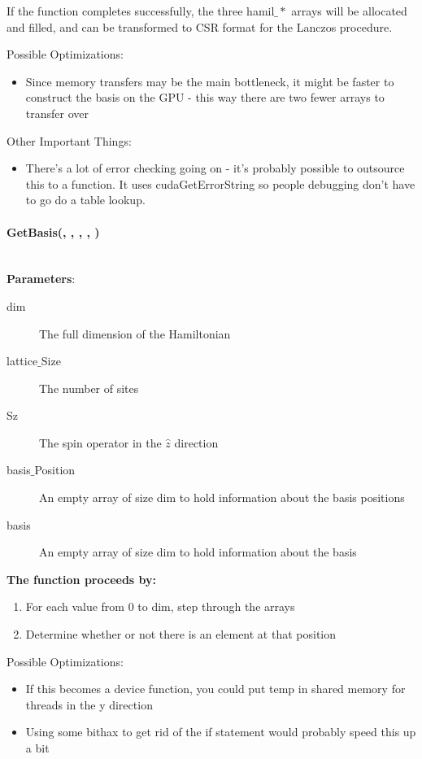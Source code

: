 \documentclass{article}
\begin{document}
If the function completes successfully, the three hamil$\_*$ arrays will be allocated and filled, and can be transformed to CSR format for the Lanczos procedure.
 
Possible Optimizations:
\begin{itemize}
\item{Since memory transfers may be the main bottleneck, it might be faster to construct the basis on the GPU - this way there are two fewer arrays to transfer over}
\end{itemize}

Other Important Things:
\begin{itemize}
\item{ There's a lot of error checking going on - it's probably possible to outsource this to a function. It uses cudaGetErrorString so people debugging don't have to go do a table lookup.}
\end{itemize} 

\paragraph{\host \void GetBasis(\int , \int , \int , \long [], \long []) \\ \\}
\noindent\textbf{Parameters}:
\begin{description}
\item[\long dim] The full dimension of the Hamiltonian
\item[\int lattice$\_$Size] The number of sites
\item[\int Sz] The spin operator in the $\hat{z}$ direction
\item[\long basis$\_$Position] An empty array of size dim to hold information about the basis positions
\item[\long basis] An empty array of size dim to hold information about the basis
\end{description}

\noindent\textbf{The function proceeds by:}
\begin{enumerate}
\item{For each value from 0 to dim, step through the arrays}
\item{Determine whether or not there is an element at that position}
\end{enumerate}

Possible Optimizations:
\begin{itemize}
\item{If this becomes a device function, you could put temp in shared memory for threads in the y direction}
\item{Using some bithax to get rid of the if statement would probably speed this up a bit}
\end{itemize}
\end{document}
